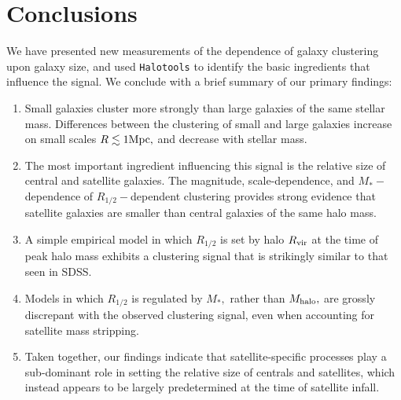 \documentclass[usenatbib,usegraphicx,letterpaper]{mn2e}
\newcommand{\ben}{\begin{enumerate}}
\newcommand{\een}{\end{enumerate}}
\newcommand{\rhalf}{R_{1/2}}
\newcommand{\mstar}{M_{\ast}}
\newcommand{\mhalo}{M_{\rm halo}}
\newcommand{\rvir}{R_{\rm vir}}
\newcommand{\mpc}{{\rm Mpc}}
\begin{document}


\section{Conclusions}
\label{sec:conclusion}

We have presented new measurements of the dependence of galaxy clustering upon galaxy size, and used {\tt Halotools} to identify the basic ingredients that influence the signal. We conclude with a brief summary of our primary findings:

\ben
\item Small galaxies cluster more strongly than large galaxies of the same stellar mass. Differences between the clustering of small and large galaxies increase on small scales $R\lesssim1\mpc,$ and decrease with stellar mass.
\item The most important ingredient influencing this signal is the relative size of central and satellite galaxies. The magnitude, scale-dependence, and $\mstar-$dependence of $\rhalf-$dependent clustering provides strong evidence that satellite galaxies are smaller than central galaxies of the same halo mass.
\item A simple empirical model in which $\rhalf$ is set by halo $\rvir$ at the time of peak halo mass exhibits a clustering signal that is strikingly similar to that seen in SDSS.
\item Models in which $\rhalf$ is regulated by $\mstar,$ rather than $\mhalo,$ are grossly discrepant with the observed clustering signal, even when accounting for satellite mass stripping.
\item Taken together, our findings indicate that satellite-specific processes play a sub-dominant role in setting the relative size of centrals and satellites, which instead appears to be largely predetermined at the time of satellite infall.
\een
\end{document}
